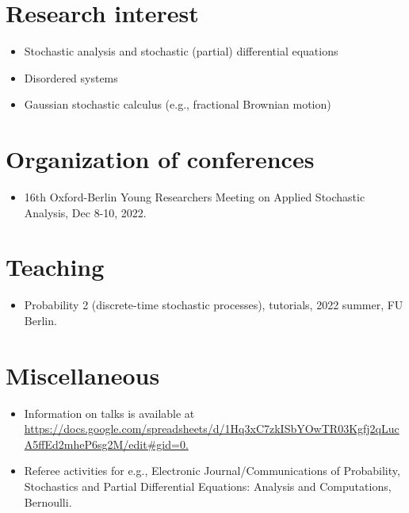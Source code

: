 \documentclass[12pt]{article}
\begin{document}
\section{Research interest}
\begin{itemize}
    \item Stochastic analysis and stochastic (partial) differential equations
    \item Disordered systems
    \item Gaussian stochastic calculus (e.g., fractional Brownian motion)
\end{itemize}

\nocite{*}
\printbibliography[title=Preprints, type=misc]
\printbibliography[title=Published, type=article]

\section{Organization of conferences}
\begin{itemize}
    \item 16th Oxford-Berlin Young Researchers Meeting on Applied Stochastic Analysis, Dec 8-10, 2022.
\end{itemize}

\section{Teaching}
\begin{itemize}
    \item Probability 2 (discrete-time stochastic processes), tutorials, 2022 summer, FU Berlin.
\end{itemize}
\section{Miscellaneous}
\begin{itemize}
    \item Information on talks is available at \url{https://docs.google.com/spreadsheets/d/1Hq3xC7zkISbYOwTR03Kgfj2qLucA5ffEd2mheP6sg2M/edit#gid=0.}
    \item Referee activities for e.g., Electronic Journal/Communications of Probability, Stochastics and Partial Differential Equations: Analysis and Computations, Bernoulli.
\end{itemize}
\end{document}
